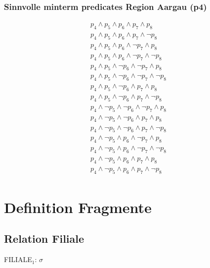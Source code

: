 \documentclass[11pt,a4paper,parskip=half]{scrartcl}
\begin{document}
\subsubsection{Sinnvolle minterm predicates Region Aargau (p4)}
\begin{align*}
p_4 \wedge p_5 \wedge p_6 \wedge p_7 \wedge p_8\\
p_4 \wedge p_5 \wedge p_6 \wedge p_7 \wedge \neg p_8\\
p_4 \wedge p_5 \wedge p_6 \wedge \neg p_7 \wedge p_8\\
p_4 \wedge p_5 \wedge p_6 \wedge \neg p_7 \wedge \neg p_8\\
p_4 \wedge p_5 \wedge \neg p_6 \wedge \neg p_7 \wedge p_8\\
p_4 \wedge p_5 \wedge \neg p_6 \wedge \neg p_7 \wedge \neg p_8\\
p_4 \wedge p_5 \wedge \neg p_6 \wedge  p_7 \wedge p_8\\
p_4 \wedge p_5 \wedge \neg p_6 \wedge  p_7 \wedge \neg p_8\\
p_4 \wedge \neg p_5 \wedge \neg p_6 \wedge \neg p_7 \wedge p_8\\
p_4 \wedge \neg p_5 \wedge \neg p_6 \wedge  p_7 \wedge p_8\\
p_4 \wedge \neg p_5 \wedge \neg p_6 \wedge  p_7 \wedge \neg p_8\\
p_4 \wedge \neg p_5 \wedge  p_6 \wedge \neg p_7 \wedge p_8\\
p_4 \wedge \neg p_5 \wedge  p_6 \wedge \neg p_7 \wedge \neg p_8\\
p_4 \wedge \neg p_5 \wedge  p_6 \wedge  p_7 \wedge  p_8\\
p_4 \wedge \neg p_5 \wedge  p_6 \wedge  p_7 \wedge \neg p_8\\
\end{align*}

\section{Definition Fragmente}
\subsection{Relation Filiale}

FILIALE$_1$: $\sigma$\textsubscript{}\\
\end{document}
